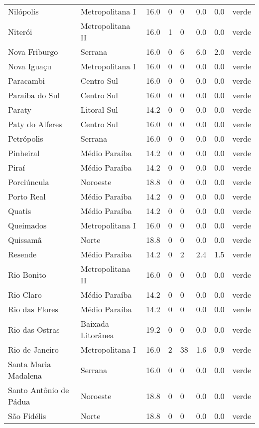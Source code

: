 \begin{longtable}{l|lllllll}
  Nilópolis & Metropolitana I & 16.0 & 0 & 0 & 0.0 & 0.0 & verde \\ 
  Niterói & Metropolitana II & 16.0 & 1 & 0 & 0.0 & 0.0 & verde \\ 
  Nova Friburgo & Serrana & 16.0 & 0 & 6 & 6.0 & 2.0 & verde \\ 
  Nova Iguaçu & Metropolitana I & 16.0 & 0 & 0 & 0.0 & 0.0 & verde \\ 
  Paracambi & Centro Sul & 16.0 & 0 & 0 & 0.0 & 0.0 & verde \\ 
  Paraíba do Sul & Centro Sul & 16.0 & 0 & 0 & 0.0 & 0.0 & verde \\ 
  Paraty & Litoral Sul & 14.2 & 0 & 0 & 0.0 & 0.0 & verde \\ 
  Paty do Alferes & Centro Sul & 16.0 & 0 & 0 & 0.0 & 0.0 & verde \\ 
  Petrópolis & Serrana & 16.0 & 0 & 0 & 0.0 & 0.0 & verde \\ 
  Pinheiral & Médio Paraíba & 14.2 & 0 & 0 & 0.0 & 0.0 & verde \\ 
  Piraí & Médio Paraíba & 14.2 & 0 & 0 & 0.0 & 0.0 & verde \\ 
  Porciúncula & Noroeste & 18.8 & 0 & 0 & 0.0 & 0.0 & verde \\ 
  Porto Real & Médio Paraíba & 14.2 & 0 & 0 & 0.0 & 0.0 & verde \\ 
  Quatis & Médio Paraíba & 14.2 & 0 & 0 & 0.0 & 0.0 & verde \\ 
  Queimados & Metropolitana I & 16.0 & 0 & 0 & 0.0 & 0.0 & verde \\ 
  Quissamã & Norte & 18.8 & 0 & 0 & 0.0 & 0.0 & verde \\ 
  Resende & Médio Paraíba & 14.2 & 0 & 2 & 2.4 & 1.5 & verde \\ 
  Rio Bonito & Metropolitana II & 16.0 & 0 & 0 & 0.0 & 0.0 & verde \\ 
  Rio Claro & Médio Paraíba & 14.2 & 0 & 0 & 0.0 & 0.0 & verde \\ 
  Rio das Flores & Médio Paraíba & 14.2 & 0 & 0 & 0.0 & 0.0 & verde \\ 
  Rio das Ostras & Baixada Litorânea & 19.2 & 0 & 0 & 0.0 & 0.0 & verde \\ 
  Rio de Janeiro & Metropolitana I & 16.0 & 2 & 38 & 1.6 & 0.9 & verde \\ 
  Santa Maria Madalena & Serrana & 16.0 & 0 & 0 & 0.0 & 0.0 & verde \\ 
  Santo Antônio de Pádua & Noroeste & 18.8 & 0 & 0 & 0.0 & 0.0 & verde \\ 
  São Fidélis & Norte & 18.8 & 0 & 0 & 0.0 & 0.0 & verde \\ 

\end{longtable}
